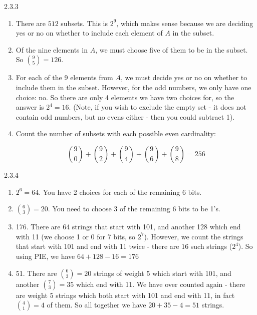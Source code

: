 \documentclass[11pt,]{book}
\theoremstyle{ptxplainnotitle}
\theoremstyle{ptxplaintitle}
\theoremstyle{ptxdefinitionnotitle}
\theoremstyle{ptxdefinitiontitle}
\theoremstyle{ptxdefinitionnotitle}
\theoremstyle{ptxdefinitiontitle}
\theoremstyle{ptxdefinitionnotitle}
\theoremstyle{ptxdefinitiontitle}
\theoremstyle{ptxdefinitiontitlenonumber}
\theoremstyle{ptxdefinitiontitlenonumber}
\numberwithin{equation}{chapter}
\begin{document}
\begin{divisionexercise}{2.3.3}
\textbf{}\hypertarget{p-1317}{}%
\leavevmode%
\begin{enumerate}[label=(\alph*)]
\item\hypertarget{li-573}{}\hypertarget{p-1318}{}%
There are \(512\) subsets. This is \(2^9\text{,}\) which makes sense because we are deciding yes or no on whether to include each element of \(A\) in the subset.%
\item\hypertarget{li-574}{}\hypertarget{p-1319}{}%
Of the nine elements in \(A\text{,}\) we must choose five of them to be in the subset. So \({9 \choose 5} = 126\text{.}\)%
\item\hypertarget{li-575}{}\hypertarget{p-1320}{}%
For each of the 9 elements from \(A\text{,}\) we must decide yes or no on whether to include them in the subset. However, for the odd numbers, we only have one choice: no. So there are only 4 elements we have two choices for, so the answer is \(2^4 = 16\text{.}\) (Note, if you wish to exclude the empty set - it does not contain odd numbers, but no evens either - then you could subtract 1).%
\item\hypertarget{li-576}{}\hypertarget{p-1321}{}%
Count the number of subsets with each possible even cardinality:%
\par
\hypertarget{p-1322}{}%
%
\begin{equation*}
{9 \choose 0} + {9 \choose 2} + {9\choose 4} + {9 \choose 6} + {9 \choose 8} = 256
\end{equation*}
%
\end{enumerate}
%
\end{divisionexercise}%
\begin{divisionexercise}{2.3.4}
\textbf{}\hypertarget{p-1346}{}%
\leavevmode%
\begin{enumerate}[label=(\alph*)]
\item\hypertarget{li-589}{}\hypertarget{p-1347}{}%
\(2^6 = 64\text{.}\) You have 2 choices for each of the remaining 6 bits.%
\item\hypertarget{li-590}{}\hypertarget{p-1348}{}%
\({6 \choose 3} = 20\text{.}\) You need to choose 3 of the remaining 6 bits to be 1's.%
\item\hypertarget{li-591}{}\hypertarget{p-1349}{}%
176. There are 64 strings that start with 101, and another 128 which end with 11 (we choose 1 or 0 for 7 bits, so \(2^7\)). However, we count the strings that start with 101 and end with 11 twice - there are \(16\) such strings (\(2^4\)). So using PIE, we have \(64 + 128 - 16 = 176\)%
\item\hypertarget{li-592}{}\hypertarget{p-1350}{}%
51. There are \({6 \choose 3} = 20\) strings of weight 5 which start with 101, and another \({7 \choose 3} = 35\) which end with 11. We have over counted again - there are weight 5 strings which both start with 101 and end with 11, in fact \({4 \choose 1} = 4\) of them. So all together we have \(20 + 35 - 4 = 51\) strings.%
\end{enumerate}
%
\end{divisionexercise}%
\end{document}
